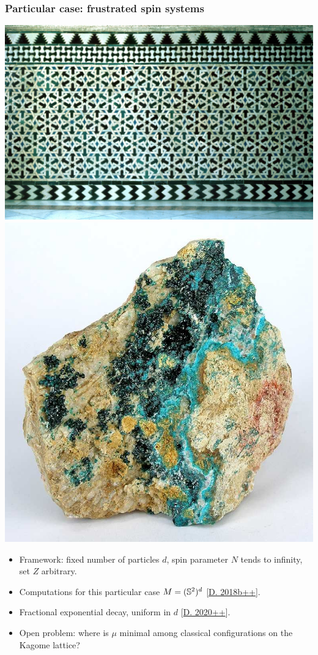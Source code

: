 \documentclass[mathserif]{beamer}
\newcommand{\mycite}[1]{{\color{mygreen} \small #1}}
\begin{document}
\begin{frame}
  \frametitle{Particular case: frustrated spin systems}
  \begin{center}
    \includegraphics[scale=6]{Alcazar.png}\includegraphics[scale=0.16]{Herbertsmithite.jpg}
  \end{center}
  \begin{itemize}
\item  Framework: fixed number of particles $d$, spin parameter $N$
  tends to infinity, set $Z$ arbitrary.

  \item<2->{Computations for this particular case
    $M=(\S^2)^d$ \mycite{[\underline{D. 2018b++}]}.}
\item<3-> Fractional exponential decay,
  {\color{myorange} uniform in $d$} \mycite{[\underline{D. 2020++}].}

  \item<4>{{\color{myorange} Open problem}: where is $\mu$ minimal among classical
      configurations on the Kagome lattice?}
  \end{itemize}
\end{frame}
\end{document}
